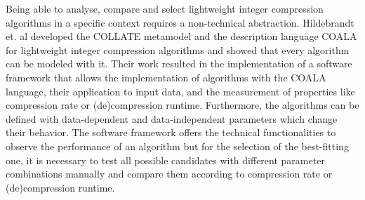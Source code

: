 Being able to analyse, compare and select lightweight integer compression algorithms in a specific context requires a non-technical abstraction. Hildebrandt et. al \cite{Hildebrandt2017} developed the COLLATE metamodel and the description language COALA for lightweight integer compression algorithms and showed that every algorithm can be modeled with it. Their work resulted in the implementation of a software framework that allows the implementation of algorithms with the COALA language, their application to input data, and the measurement of properties like compression rate or (de)compression runtime. Furthermore, the algorithms can be defined with data-dependent and data-independent parameters which change their behavior. The software framework offers the technical functionalities to observe the performance of an algorithm but for the selection of the best-fitting one, it is necessary to test all possible candidates with different parameter combinations manually and compare them according to compression rate or (de)compression runtime.

